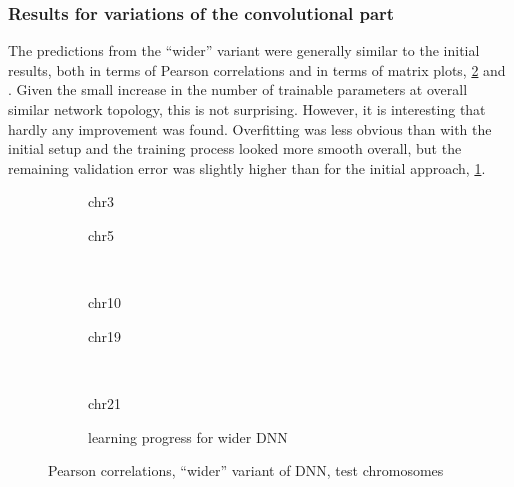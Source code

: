 \subsubsection{Results for variations of the convolutional part} \label{sec:results:wider-longer-etc}
The predictions from the ``wider'' variant were generally similar to the initial results,
both in terms of Pearson correlations and in terms of matrix plots, \cref{fig:results:widerDNN_pearson} and \xxx.
Given the small increase in the number of trainable parameters at overall similar network topology, this is not surprising.
However, it is interesting that hardly any improvement was found.
Overfitting was less obvious than with the initial setup and the training process looked more smooth overall, 
but the remaining validation error was slightly higher than for the initial approach, \cref{fig:results:widerDNN_lossEpochs}.
\begin{figure}[p]
    \begin{subfigure}{0.45\textwidth}
        \scriptsize
        \caption{chr3}
    \end{subfigure} \hfill
    \begin{subfigure}{0.45\textwidth}
        \scriptsize
        \caption{chr5}
    \end{subfigure}\\[5mm]
    \begin{subfigure}{0.45\textwidth}
        \scriptsize
        \caption{chr10}
    \end{subfigure}\hfill
    \begin{subfigure}{0.45\textwidth}
        \scriptsize
        \caption{chr19}
    \end{subfigure}\\[3mm]
    \centering
    \begin{subfigure}{0.45\textwidth}
        \scriptsize
        \caption{chr21}
    \end{subfigure}\hfill
    \begin{subfigure}{0.45\textwidth}
        \caption{learning progress for wider DNN} \label{fig:results:widerDNN_lossEpochs}
    \end{subfigure}
    \caption{Pearson correlations, ``wider'' variant of DNN,  test chromosomes}
    \label{fig:results:widerDNN_pearson}
\end{figure}

